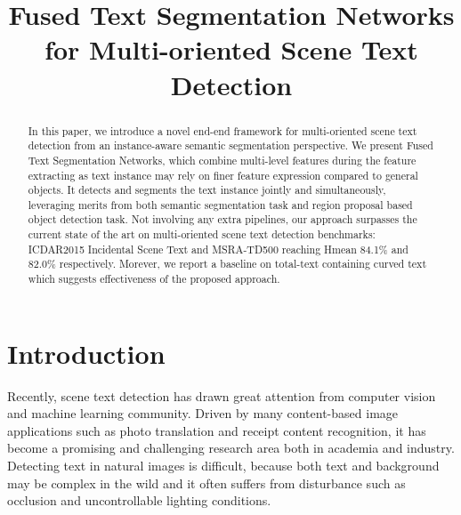 \documentclass[a4paper,conference]{IEEEtran}
\begin{document}
\title{Fused Text Segmentation Networks for Multi-oriented Scene Text Detection}




\author{

}













\maketitle

\begin{abstract}
In this paper, we introduce a novel end-end framework for multi-oriented scene text detection from an instance-aware semantic segmentation perspective. We present Fused Text Segmentation Networks, which combine multi-level features during the feature extracting as text instance may rely on finer feature expression compared to general objects. It detects and segments
the text instance jointly and simultaneously, leveraging merits from both semantic segmentation task and region proposal based object detection task. Not involving any extra pipelines, our approach surpasses the current state of the art on 
multi-oriented scene text detection benchmarks: ICDAR2015 Incidental Scene Text and MSRA-TD500 reaching Hmean 84.1\%  and 82.0\% respectively. Morever, we report a baseline on total-text containing curved text which suggests effectiveness of the proposed approach. 
\end{abstract}




\IEEEpeerreviewmaketitle



\section{Introduction}
Recently, scene text detection has drawn great attention from computer vision and machine learning community. Driven by many content-based image applications such as photo translation and receipt content recognition, it has become a promising and challenging research area both in academia and industry. Detecting text in natural images is difficult, because both text and background may be complex in the wild and it often suffers from disturbance such as occlusion and uncontrollable lighting conditions\cite{Zhu2016Scene}.
\end{document}
